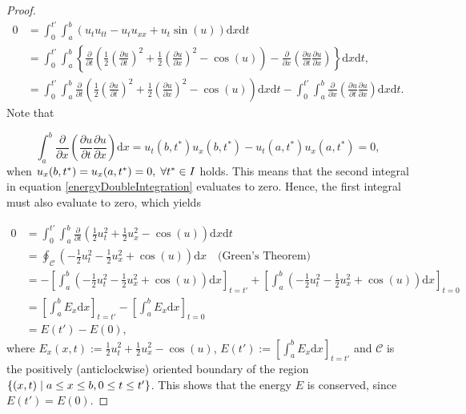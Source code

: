 \begin{proof}
\begin{align}
    0 &=\int_0^{t'}\int_a^b\left(u_tu_{tt} - u_tu_{xx} + u_t\sin{(u)}\right)\mathrm{d}x\mathrm{d}t\nonumber \\
    &=\int_0^{t'} \int_a^b\left\{\frac{\partial}{\partial t}\left(\frac{1}{2}\left(\frac{\partial u}{\partial t}\right)^2 + \frac{1}{2}\left(\frac{\partial u}{\partial x}\right)^2 - \cos{(u)}\right) - \frac{\partial }{\partial x}\left(\frac{\partial u}{\partial t}\frac{\partial u}{\partial x}\right)\right\} \mathrm{d}x\mathrm{d}t, \nonumber \\
    &=\int_0^{t'}\int_a^b \frac{\partial}{\partial t}\left(\frac{1}{2}\left(\frac{\partial u}{\partial t}\right)^2 + \frac{1}{2}\left(\frac{\partial u}{\partial x}\right)^2 - \cos{(u)}\right)\mathrm{d}x\mathrm{d}t - \int_0^{t'}\int_a^b\frac{\partial }{\partial x}\left(\frac{\partial u}{\partial t}\frac{\partial u}{\partial x}\right)\mathrm{d}x\mathrm{d}t.
    \label{energyDoubleIntegration}
\end{align}
Note that

\begin{equation*}
    \int_a^b\frac{\partial }{\partial x}\left(\frac{\partial u}{\partial t}\frac{\partial u}{\partial x}\right)\mathrm{d}x = u_t(b,t^*)u_x(b,t^*)-u_t(a,t^*)u_x(a,t^*) = 0, 
\end{equation*}
when $u_x(b,t^*) = u_x(a,t^*) = 0, \hspace{1mm} \forall t^* \in I$ holds. This means that the second integral in equation \eqref{energyDoubleIntegration} evaluates to zero. Hence, the first integral must also evaluate to zero, which yields

\begin{equation*}
    \begin{split}
        0 &= \int_0^{t'}\int_a^b \frac{\partial}{\partial t} \left(\frac{1}{2}u_t^2 + \frac{1}{2}u_x^2 - \cos{(u)}\right)  \mathrm{d}x\mathrm{d}t \\
        &= \oint_\mathcal{C} \left(-\frac{1}{2}u_t^2 - \frac{1}{2}u_x^2 + \cos{(u)}\right)\mathrm{d}x \quad \text{(Green's Theorem)} \\
        &= -\left[ \int_a^b \left(-\frac{1}{2}u_t^2 - \frac{1}{2}u_x^2 + \cos{(u)}\right)\mathrm{d}x\right]_{t = t'} +  \left[ \int_a^b \left(-\frac{1}{2}u_t^2 - \frac{1}{2}u_x^2 + \cos{(u)}\right)\mathrm{d}x\right]_{t = 0} \\
        &= \left[ \int_a^b E_x\mathrm{d}x\right]_{t = t'} - \left[ \int_a^b E_x\mathrm{d}x\right]_{t = 0} \\
        &= E(t') - E(0), 
    \end{split}
\end{equation*}
where $E_x(x,t) := \frac{1}{2}u_t^2 + \frac{1}{2}u_x^2 - \cos{(u)}$, $E(t') := \left[ \int_a^b E_x\mathrm{d}x\right]_{t = t'}$ and $\mathcal{C}$ is the positively (anticlockwise) oriented boundary of the region $\{(x,t) \hspace{1mm} | \hspace{1mm} a \leq x \leq b, 0 \leq t \leq t' \}$. This shows that the energy $E$ is conserved, since $E(t') = E(0)$. 
\end{proof}

